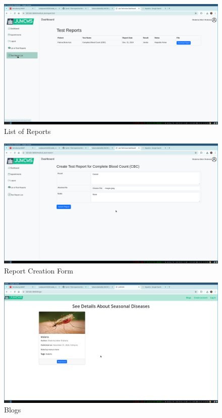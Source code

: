 \documentclass[a4paper,12pt]{article}
\begin{document}
\begin{figure}[H]
    \centering
    \includegraphics[width=1\textwidth]{images/sprintoutput06.png}
    \caption{List of Reports}
    \label{fig:reportlist}
\end{figure}

\begin{figure}[H]
    \centering
    \includegraphics[width=1\textwidth]{images/sprintoutput07.png}
    \caption{Report Creation Form}
    \label{fig:reportform}
\end{figure}

\begin{figure}[H]
    \centering
    \includegraphics[width=1\textwidth]{images/sprintoutput08.png}
    \caption{Blogs}
    \label{fig:blogs}
\end{figure}
\end{document}
